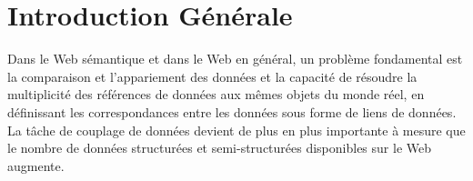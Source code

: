 \documentclass[12pt]{report}
\begin{document}
%
%

\listoffigures
\listoftables
\pagebreak
{\large
\printacronyms[include-classes=abbrev,name=Liste des abréviations]}
\tableofcontents
{}
\chapter*{Introduction Générale}
 
Dans le Web sémantique et dans le Web en général, un problème fondamental est la comparaison et l’appariement des données et la capacité de résoudre la multiplicité des références de données aux mêmes objets du monde réel, en définissant les correspondances entre les données sous forme de liens de données. La tâche de couplage de données devient de plus en plus importante à mesure que le nombre de données structurées et semi-structurées disponibles sur le Web augmente.
\end{document}
